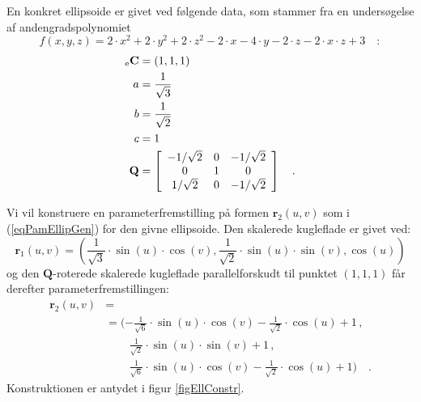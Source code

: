 \begin{example} \label{exampEllipsoide}
En konkret ellipsoide er givet ved følgende data, som stammer fra en undersøgelse af andengradspolynomiet
\begin{equation}
 f(x,y, z) =  2\cdot x^{2} + 2\cdot y^{2} + 2\cdot z^{2} - 2\cdot x - 4\cdot y - 2 \cdot z - 2\cdot x \cdot z + 3 \quad :
\end{equation}
\begin{equation}
\begin{aligned}
{_\mathrm{e}\mathbf{\mathbf{C}}} &= (1,1,1) \\
a&= \frac{1}{\sqrt{3}} \\
b&= \frac{1}{\sqrt{2}} \\
c&= 1 \\
\mathbf{Q} &= \left[
                \begin{array}{ccc}
                  -1/\sqrt{2} & 0 & -1/\sqrt{2} \\
                  0 & 1 & 0 \\
                  1/\sqrt{2} & 0 & -1/\sqrt{2} \\
                \end{array}
              \right] \quad .
\end{aligned}
\end{equation}

Vi vil konstruere en parameterfremstilling på formen ${\mathbf{r}}_{2}(u,v)$ som i (\ref{eqPamEllipGen}) for den givne ellipsoide.
Den skalerede kugleflade er givet ved:
\begin{equation}
{\mathbf{r}_{1}}(u,v) = \left(\frac{1}{\sqrt{3}}\cdot \sin(u) \cdot \cos(v) , \frac{1}{\sqrt{2}}\cdot \sin(u) \cdot \sin(v) , \cos(u) \right)
\end{equation}
og den $\mathbf{Q}$-roterede skalerede kugleflade parallelforskudt til punktet $(1,1,1)$ får derefter parameterfremstillingen:
\begin{equation}
\begin{aligned}
{\mathbf{r}}_{2}(u,v)  &= \\
&= (-\frac{1}{\sqrt{6}}\cdot \sin(u)\cdot \cos(v) - \frac{1}{\sqrt{2}}\cdot \cos(u) +1 \, , \\  \,
&\phantom{aaaa}\frac{1}{\sqrt{2}}\cdot \sin(u)\cdot \sin(v) + 1 \, , \\
&\phantom{aaaa}\frac{1}{\sqrt{6}}\cdot \sin(u)\cdot \cos(v) - \frac{1}{\sqrt{2}}\cdot \cos(u) + 1) \quad.
\end{aligned}
\end{equation}
Konstruktionen er antydet i figur \ref{figEllConstr}.
\end{example}

